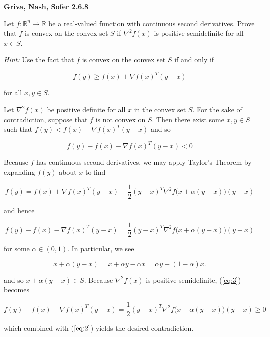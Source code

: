 \textbf{Griva, Nash, Sofer 2.6.8}

Let $f: \mathbb{R}^n \to \mathbb{R}$ be a real-valued function with continuous second 
derivatives.  Prove that $f$ is convex on the convex set $S$ if $\nabla^2 f(x)$ is 
positive semidefinite for all $x \in S$.

\textit{Hint: } Use the fact that $f$ is convex on the convex set $S$ if and only if

$$
  f(y) \ge f(x) + \nabla f(x)^T (y - x)
$$

for all $x, y \in S$.


\begin{solution}
  Let $\nabla^2 f(x)$ be positive definite for all $x$ in the convex set $S$. For the sake
  of contradiction, suppose that $f$ is not convex on $S$. Then there exist some $x, y \in S$
  such that $f(y) < f(x) + \nabla f(x)^T (y - x)$ and so 
 
  \begin{equation}\label{eq:2}
    f(y) - f(x) - \nabla f(x)^T (y - x) < 0
  \end{equation}
  
  Because $f$ has continuous second derivatives,
  we may apply Taylor's Theorem by expanding $f(y)$ about $x$ to find

  $$
    f(y) = f(x) + \nabla f(x)^T (y - x) + \frac{1}{2} (y - x)^T \nabla^2 f\big(x + \alpha(y - x)\big) (y - x)
  $$

  and hence 

  \begin{equation} \label{eq:3}
    f(y) - f(x) - \nabla f(x)^T (y - x) = \frac{1}{2} (y - x)^T \nabla^2 f\big(x + \alpha(y - x)\big) (y - x)
  \end{equation}

  for some $\alpha \in (0, 1)$. In particular, we see

  $$
  x + \alpha (y - x) = x + \alpha y - \alpha x = \alpha y + (1 - \alpha) x.
  $$

  and so $x + \alpha(y - x) \in S$. Because $\nabla^2 f(x)$ is positive semidefinite, (\ref{eq:3})
  becomes
  
  $$
    f(y) - f(x) - \nabla f(x)^T (y - x) = \frac{1}{2} (y - x)^T \nabla^2 f\big(x + \alpha(y - x)\big) (y - x) \ge 0
  $$

  which combined with ($\ref{eq:2}$) yields the desired contradiction.
  \ \\
\end{solution}